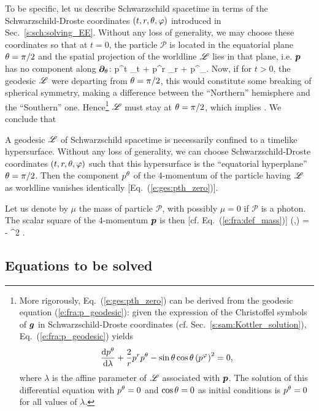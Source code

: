 To be specific, let us describe Schwarzschild spacetime in terms of the
Schwarzschild-Droste coordinates $(t,r,\theta,\varphi)$ introduced in Sec.~\ref{s:sch:solving_EE}.
Without any loss of generality, we may choose these coordinates so that
at $t=0$, the particle $\mathscr{P}$ is located in the equatorial plane $\theta=\pi/2$ and
the spatial projection of the worldline $\mathscr{L}$ lies in that plane, i.e. $\bm{p}$ has
no component along $\bm{\partial}_\theta$:
\be
      p^t \wpar_{t} + p^r \wpar_r + p^\ph \wpar_\ph .
\ee
Now, if for $t>0$, the geodesic $\mathscr{L}$ were departing from $\theta=\pi/2$, this
would constitute some breaking of spherical symmetry, making a difference
between the ``Northern'' hemisphere and the ``Southern'' one.
Hence\footnote{More rigorously, Eq.~(\ref{e:ges:pth_zero}) can
be derived from the geodesic equation (\ref{e:fra:p_geodesic}): given
the expression of the Christoffel symbols of $\bm{g}$ in Schwarzschild-Droste
coordinates (cf. Sec.~\ref{s:sam:Kottler_solution}), Eq.~(\ref{e:fra:p_geodesic})
yields \[\frac{\mathrm{d} p^\theta}{\mathrm{d}\lambda} +\frac{2}{r}  p^r p^\theta - \sin\theta\cos\theta \left( p^\varphi \right)^2 = 0,\] where $\lambda$ is the affine parameter of $\mathscr{L}$ associated with $\bm{p}$. The solution of this differential equation with $p^\theta=0$ and
$\cos\theta=0$ as initial conditions is $p^\theta=0$ for all values of $\lambda$.} $\mathscr{L}$
must stay at $\theta=\pi/2$, which implies
\be \label{e:ges:pth_zero}
     .
\ee
We conclude that
\begin{greybox}
A geodesic $\mathscr{L}$ of Schwarzschild spacetime is necessarily confined to a timelike hypersurface.
Without any loss of generality, we can choose Schwarzschild-Droste coordinates $(t,r,\theta,\varphi)$
such that this hypersurface is the ``equatorial hyperplane'' $\theta=\pi/2$.
Then the component $p^\theta$ of the 4-momentum of the particle having $\mathscr{L}$ as worldline
vanishes identically [Eq.~(\ref{e:ges:pth_zero})].
\end{greybox}

Let us denote by $\mu$ the mass of particle $\mathscr{P}$, with possibly
$\mu=0$ if $\mathscr{P}$ is a photon. The scalar square of the 4-momentum $\bm{p}$ is
then [cf. Eq.~(\ref{e:fra:def_mass})]
\be \label{e:ges:p2_mu2}
    (,) = - \mu^2 .
\ee

\subsection{Equations to be solved}

